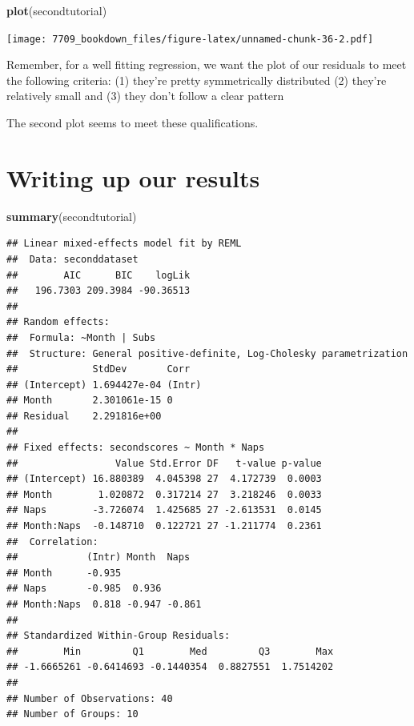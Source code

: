 \documentclass[]{book}
\newenvironment{Shaded}{\begin{snugshade}}{\end{snugshade}}
\newcommand{\KeywordTok}[1]{\textcolor[rgb]{0.13,0.29,0.53}{\textbf{#1}}}
\newcommand{\NormalTok}[1]{#1}
\begin{document}
\begin{Shaded}
\begin{Highlighting}[]
\KeywordTok{plot}\NormalTok{(secondtutorial)}
\end{Highlighting}
\end{Shaded}

\texttt{[image: 7709\_bookdown\_files/figure-latex/unnamed-chunk-36-2.pdf]}

Remember, for a well fitting regression, we want the plot of our residuals to meet the following criteria:
(1) they're pretty symmetrically distributed
(2) they're relatively small and
(3) they don't follow a clear pattern

The second plot seems to meet these qualifications.

\hypertarget{writing-up-our-results}{%
\section{Writing up our results}\label{writing-up-our-results}}

\begin{Shaded}
\begin{Highlighting}[]
\KeywordTok{summary}\NormalTok{(secondtutorial)}
\end{Highlighting}
\end{Shaded}

\begin{verbatim}
## Linear mixed-effects model fit by REML
##  Data: seconddataset 
##        AIC      BIC    logLik
##   196.7303 209.3984 -90.36513
## 
## Random effects:
##  Formula: ~Month | Subs
##  Structure: General positive-definite, Log-Cholesky parametrization
##             StdDev       Corr  
## (Intercept) 1.694427e-04 (Intr)
## Month       2.301061e-15 0     
## Residual    2.291816e+00       
## 
## Fixed effects: secondscores ~ Month * Naps 
##                 Value Std.Error DF   t-value p-value
## (Intercept) 16.880389  4.045398 27  4.172739  0.0003
## Month        1.020872  0.317214 27  3.218246  0.0033
## Naps        -3.726074  1.425685 27 -2.613531  0.0145
## Month:Naps  -0.148710  0.122721 27 -1.211774  0.2361
##  Correlation: 
##            (Intr) Month  Naps  
## Month      -0.935              
## Naps       -0.985  0.936       
## Month:Naps  0.818 -0.947 -0.861
## 
## Standardized Within-Group Residuals:
##        Min         Q1        Med         Q3        Max 
## -1.6665261 -0.6414693 -0.1440354  0.8827551  1.7514202 
## 
## Number of Observations: 40
## Number of Groups: 10
\end{verbatim}
\end{document}
